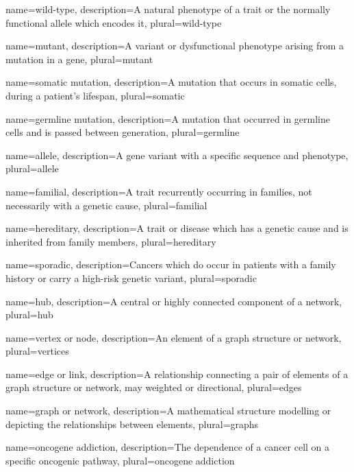 {
  name=wild-type,
  description={A natural phenotype of a trait or the normally functional \gls{allele} which encodes it},
  plural=wild-type
}


{
  name=mutant,
  description={A variant or dysfunctional phenotype arising from a \gls{mutation} in a gene},
  plural=mutant
}


{
  name=somatic mutation,
  description={A \gls{mutation} that occurs in somatic cells, during a patient's lifespan},
  plural=somatic
}

{
  name=germline mutation,
  description={A \gls{mutation} that occurred in germline cells and is passed between generation},
  plural=germline
}

{
  name=allele,
  description={A gene variant with a specific sequence and phenotype},
  plural=allele
}

{
  name=familial,
  description={A trait recurrently occurring in families, not necessarily with a genetic cause},
  plural=familial
}


{
  name=hereditary,
  description={A trait or disease which has a genetic cause and is inherited from family members},
  plural=hereditary
}


{
  name=sporadic,
  description={Cancers which do occur in patients with a family history or carry a high-risk genetic variant},
  plural=sporadic
}


{
  name=hub,
  description={A central or highly connected component of a network},
  plural=hub
}


{
  name=vertex or node,
  description={An element of a graph structure or network},
  plural=vertices
}


{
  name=edge or link,
  description={A relationship connecting a pair of elements of a graph structure or network, may weighted or directional},
  plural=edges
}


{
  name=graph or network,
  description={A mathematical structure modelling or depicting the relationships between elements},
  plural=graphs
}


{
  name=oncogene addiction,
  description={The dependence of a cancer cell on a specific oncogenic pathway},
  plural=oncogene addiction
}


